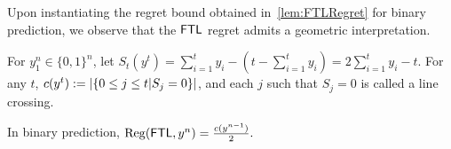 
Upon instantiating the regret bound obtained in~\cref{lem:FTLRegret} for binary prediction, we observe that the $\mathsf{FTL}$ regret admits a geometric interpretation. 
\begin{definition}\label{defn:StateLineCross}
    For $y_1^n\in\{0,1\}^n$, let  $S_t(y^t) = \textstyle\sum_{i=1}^t y_i - (t-\textstyle\sum_{i=1}^t y_i) = 2\textstyle\sum_{i=1}^t y_i - t$. 
 For any $t$, 
     $c(y^t) \mathrel{\mathop{:}}= \left|\left\{0 \le j \le t | S_j = 0\right\}\right|$,
 and each $j$ such that $S_j = 0$ is called a line crossing. 
\end{definition}

\begin{corollary} \label{cor:BinPred}
    In binary prediction,
        $\mathrm{Reg}(\mathsf{FTL}, y^n) = \frac{c(y^{n-1})}{2}.$
\end{corollary}
